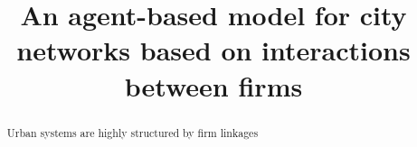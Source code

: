 \documentclass{article}
\title{An agent-based model for city networks based on interactions between firms}
\date{}
\begin{document}
\maketitle

\begin{abstract}
	Urban systems are highly structured by firm linkages
\end{abstract}







\end{document}
